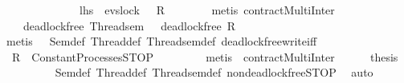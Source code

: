 \begin{isabellebody}
\ \ \ \ \ \ \ \ \ \ \ \ \ {\isacharparenleft}{\kern0pt}\ {\isachardoublequoteopen}{\isacharquery}{\kern0pt}lhs\ {\isacharequal}{\kern0pt}\ evs{\isachardot}{\kern0pt}lock\ {}\ {\isasymrightarrow}\ {\isacharquery}{\kern0pt}R{\isacharprime}{\kern0pt}{\isachardoublequoteclose}{\isacharparenright}{\kern0pt}\isanewline
\ \ \ \ \ \ \isamarkupfalse%
\ {\isacharparenleft}{\kern0pt}metis\ contractMultiInter{}{\isacharparenright}{\kern0pt}\isanewline
\ \ \ \ \isamarkupfalse%
\ {}\ {\isacharcolon}{\kern0pt}\ {\isacartoucheopen}{\isacharparenleft}{\kern0pt}{\isasymnot}\ deadlock{\isacharunderscore}{\kern0pt}free\ Thread{}{\isacharunderscore}{\kern0pt}sem{\isacharparenright}{\kern0pt}\ {\isacharequal}{\kern0pt}\ {\isacharparenleft}{\kern0pt}{\isasymnot}\ deadlock{\isacharunderscore}{\kern0pt}free\ {\isacharquery}{\kern0pt}R{\isacharprime}{\kern0pt}{\isacharparenright}{\kern0pt}{\isacartoucheclose}\isanewline
\ \ \ \ \ \ \isamarkupfalse%
\ {\isacharparenleft}{\kern0pt}metis\ {}\ {}\ Sem{\isacharunderscore}{\kern0pt}def\ Thread{}{\isacharunderscore}{\kern0pt}def\ Thread{}{\isacharunderscore}{\kern0pt}sem{\isacharunderscore}{\kern0pt}def\ deadlock{\isacharunderscore}{\kern0pt}free{\isacharunderscore}{\kern0pt}write{}{\isacharunderscore}{\kern0pt}iff{\isacharparenright}{\kern0pt}\isanewline
\ \ \ \ \isamarkupfalse%
\ {}{\isacharcolon}{\kern0pt}\ {\isacartoucheopen}{\isacharquery}{\kern0pt}R{\isacharprime}{\kern0pt}\ {\isacharequal}{\kern0pt}\ Constant{\isacharunderscore}{\kern0pt}Processes{\isachardot}{\kern0pt}STOP{\isacartoucheclose}\ \isanewline
\ \ \ \ \ \ \isamarkupfalse%
\ {\isacharparenleft}{\kern0pt}metis\ {}\ contractMultiInter{}{\isacharparenright}{\kern0pt}\isanewline
\ \ \ \ \isamarkupfalse%
\ {\isacharquery}{\kern0pt}thesis\isanewline
\ \ \ \ \ \ \isamarkupfalse%
\ {}\ {}\ Sem{\isacharunderscore}{\kern0pt}def\ Thread{}{\isacharunderscore}{\kern0pt}def\ Thread{}{\isacharunderscore}{\kern0pt}sem{\isacharunderscore}{\kern0pt}def\ non{\isacharunderscore}{\kern0pt}deadlock{\isacharunderscore}{\kern0pt}free{\isacharunderscore}{\kern0pt}STOP\ \isamarkupfalse%
\ auto\isanewline
\ \ \isamarkupfalse%
\isanewline
{}\isamarkupfalse%
%
\endisatagproof
{\isafoldproof}%
%
\isadelimproof

\end{isabellebody}
